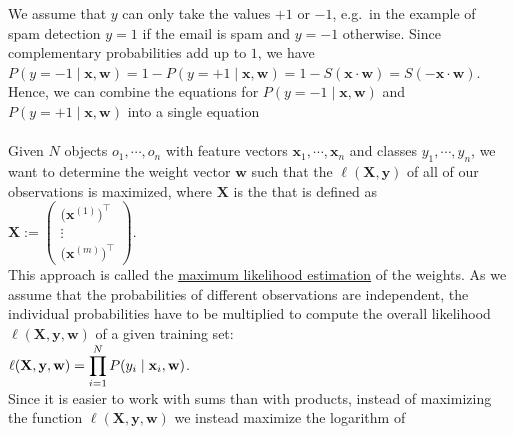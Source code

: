 We assume that $y$ can only take the values $+1$ or $-1$,  e.g.~in the example of spam detection $y = 1$ if the
email is spam and $y = -1$ otherwise.  Since complementary probabilities add up to $1$, we have
\\[0.2cm]
\hspace*{1.3cm}
$P(y=-1\;|\;\mathbf{x},\mathbf{w}) = 1 - P(y=+1\;|\;\mathbf{x},\mathbf{w}) 
  = 1 - S(\mathbf{x} \cdot \mathbf{w}) = S(-\mathbf{x} \cdot \mathbf{w})
$.
\\[0.2cm]
Hence, we can combine the equations for $P(y=-1\;|\;\mathbf{x},\mathbf{w})$ and $P(y=+1\;|\;\mathbf{x},\mathbf{w})$ into a
single equation
\\[0.2cm]
\hspace*{1.3cm}
\colorbox{red}{}
\\[0.2cm]
Given $N$ objects $o_1, \cdots, o_n $ with feature vectors $\mathbf{x}_1, \cdots, \mathbf{x}_n$ and classes
$y_1,\cdots,y_n$, we
want to determine the weight vector $\mathbf{w}$ such that the  $\ell(\mathbf{X}, \mathbf{y})$
 of all of our
observations is maximized, where $\mathbf{X}$ is the  that is defined as
\\[0.2cm]
\hspace*{1.3cm}
$\mathbf{X} := \left(
  \begin{array}{c}
    \bigl(\mathbf{x}^{(1)}\bigr)^\top  \\
    \vdots                         \\
    \bigl(\mathbf{x}^{(m)}\bigr)^\top
  \end{array}
  \right).   
$
\\[0.2cm]
This approach is called the 
\href{https://en.wikipedia.org/wiki/Maximum_likelihood_estimation}{maximum likelihood estimation}
 of the weights.
As we assume that the probabilities of different observations are independent, the individual
probabilities have to be multiplied to compute the overall likelihood $\ell(\mathbf{X}, \mathbf{y},\mathbf{w})$ 
of a given training set:
\\[0.2cm]
\hspace*{1.3cm}
$\displaystyle \ell(\mathbf{X},\mathbf{y},\mathbf{w}) = \prod\limits_{i=1}^N P(y_i \;|\;\mathbf{x}_i,\mathbf{w})$.
\\[0.2cm]
Since it is easier to work with sums than with products, instead of maximizing the function
$\ell(\mathbf{X},\mathbf{y},\mathbf{w})$ we instead maximize the logarithm of
